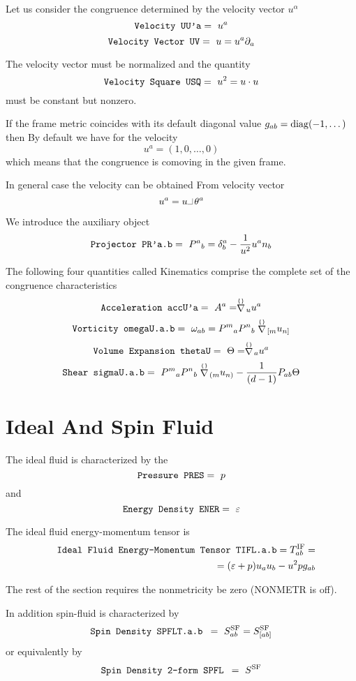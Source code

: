 \documentclass[twoside,openright]{report}
\newcommand{\grgtt}{\ttfamily}
\newcommand{\rim}[1]{\stackrel{\scriptscriptstyle\{\}}{#1}\!}
\newcommand{\object}[2]{%
\begin{equation}
\mbox{\comm{#1}} =\ #2
\end{equation}}
\newcommand{\ipr}{\rule{1.8mm}{.1mm}\rule{.1mm}{2.2mm}\,} %
\newcommand{\pref}[1]{page \pageref{#1}}
\newcommand{\seethis}[1]{\marginpar{\footnotesize\it #1}}
\renewcommand{\tt}{\grgtt}
\newcommand{\comm}[1]{{\upshape\tt#1}}    %
\begin{document}
Let us consider the congruence determined by the velocity
vector $u^\alpha$
\object{Velocity UU'a}{u^a}
\object{Velocity Vector UV}{u=u^a\partial_a}

The velocity vector must be normalized and the quantity
\object{Velocity Square USQ}{u^2=u\cdot u}
must be constant but nonzero.

If the frame metric coincides with its default
diagonal value \seethis{See \pref{defaultmetric}.}
$g_{ab}={\rm diag}(-1,\dots)$
then {\tt By default} we have for the velocity
\begin{equation}
u^a=(1,0,\dots,0)
\end{equation}
which means that the congruence is comoving in the given frame.

In general case the velocity can be obtained
{\tt From velocity vector}
\begin{equation}
u^a=u\ipr \theta^a
\end{equation}

We introduce the auxiliary object
\object{Projector PR'a.b}{P^a{}_b=
\delta^a_b-\frac{1}{u^2}u^an_b}

The following four quantities called {\tt Kinematics}
comprise the complete set of the congruence characteristics
\object{Acceleration accU'a}{A^a=\rim{\nabla}_uu^a}
\object{Vorticity omegaU.a.b}{\omega_{ab}=
P^m{}_aP^n{}_b \rim{\nabla}_{[m}u_{n]}}
\object{Volume Expansion thetaU}{\Theta=\rim{\nabla}_au^a}
\object{Shear sigmaU.a.b}{
P^m{}_aP^n{}_b \rim{\nabla}_{(m}u_{n)}-
\frac{1}{(d-1)}P_{ab}\Theta}


\section{Ideal And Spin Fluid}


The ideal fluid is characterized by the
\object{Pressure PRES}{p}
and
\object{Energy Density ENER}{\varepsilon}

The ideal fluid energy-momentum tensor is
\begin{eqnarray}
&&\mbox{\tt Ideal Fluid Energy-Momentum Tensor  TIFL.a.b}=
T^{\rm IF}_{ab} = \nonumber\\
&&\qquad\qquad=(\varepsilon+p)u_a u_b - u^2p g_{ab}
\end{eqnarray}

The rest of the section requires the nonmetricity be zero
(\comm{NONMETR} is off).

In addition  spin-fluid is characterized by
\object{Spin Density SPFLT.a.b }{S^{\rm SF}_{ab}=S^{\rm SF}_{[ab]}}
or equivalently by
\object{Spin Density 2-form SPFL }{S^{\rm SF}}
\end{document}
